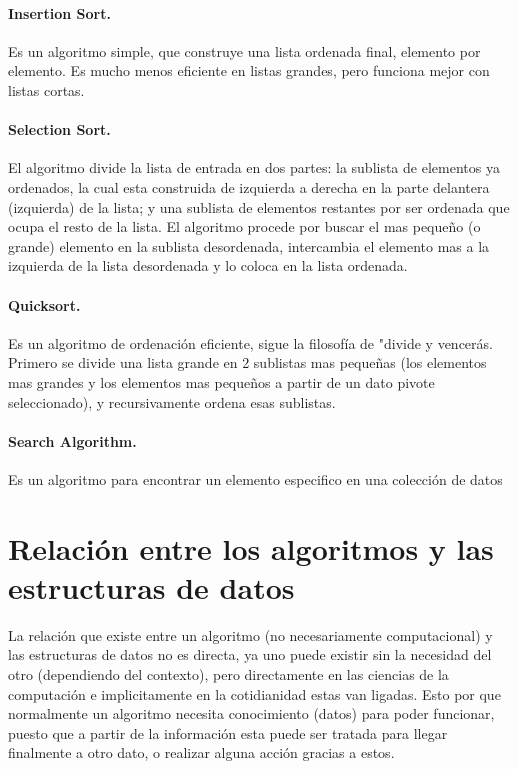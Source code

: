 \documentclass[spanish,12pt,letterpapper]{article}
\begin{document}
	\paragraph{Insertion Sort.}
	Es un algoritmo simple, que construye una lista ordenada final, elemento por elemento. Es mucho menos eficiente en listas grandes, pero funciona mejor con listas cortas. 
	
	\paragraph{Selection Sort.}
	El algoritmo divide la lista de entrada en dos partes: la sublista de elementos ya ordenados, la cual esta construida de izquierda a derecha en la parte delantera (izquierda) de la lista; y una sublista de elementos restantes por ser ordenada que ocupa el resto de la lista. El algoritmo procede por buscar el mas pequeño (o grande) elemento en la sublista desordenada, intercambia el elemento mas a la izquierda de la lista desordenada y lo coloca en la lista ordenada.
	
	\paragraph{Quicksort.}
	Es un algoritmo de ordenación eficiente, sigue la filosofía de "divide y vencerás. Primero se divide una lista grande en 2 sublistas mas pequeñas (los elementos mas grandes y los elementos mas pequeños a partir de un dato pivote seleccionado), y recursivamente ordena esas sublistas.
	
	\paragraph{Search Algorithm.}
	Es un algoritmo para encontrar un elemento especifico en una colección de datos
	
	\pagebreak
	
	\section{Relaci\'on entre los algoritmos y las estructuras de datos \\}
	La relaci\'on que existe entre un algoritmo (no necesariamente computacional) y las estructuras de datos no es directa, ya uno puede existir sin la necesidad del otro (dependiendo del contexto), pero directamente en las ciencias de la computaci\'on e implicitamente en la cotidianidad estas van ligadas. Esto por que normalmente un algoritmo necesita conocimiento (datos) para poder funcionar, puesto que a partir de la informaci\'on esta puede ser tratada para llegar finalmente a otro dato, o realizar alguna acci\'on gracias a estos. \\
	
\end{document}
